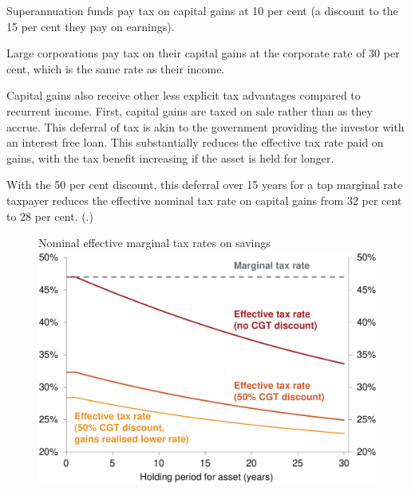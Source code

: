 \documentclass{grattanAlpha}\usepackage[]{graphicx}\usepackage[]{color}
\begin{document}
Superannuation funds pay tax on capital gains at 10 per cent (a discount to the 15 per cent they pay on earnings). 

Large corporations pay tax on their capital gains at the corporate rate of 30 per cent, which is the same rate as their income.

Capital gains also receive other less explicit tax advantages compared to recurrent income. First, capital gains are taxed on sale rather than as they accrue. This deferral of tax is akin to the government providing the investor with an interest free loan.  This substantially reduces the effective tax rate paid on gains, with the tax benefit increasing if the asset is held for longer.


With the 50 per cent discount, this deferral over 15 years for a top marginal rate taxpayer reduces the effective nominal tax rate on capital gains from 32 per cent to 28 per cent. (.)

\begin{figure}
%
{Nominal effective marginal tax rates on savings}\label{fig:CG-marginal-tax-rates-delayed}
\includegraphics[width=\columnwidth]{CGT-NG-atlas/CG-marginal-tax-rates-delayed.pdf}

\end{figure}
\end{document}
